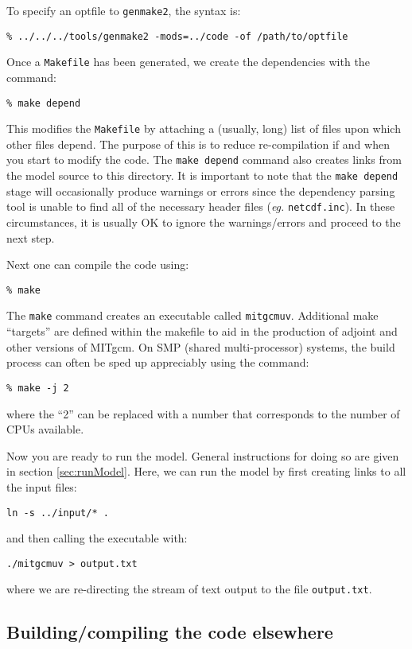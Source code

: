 To specify an optfile to \texttt{genmake2}, the syntax is:
\begin{verbatim}
% ../../../tools/genmake2 -mods=../code -of /path/to/optfile
\end{verbatim}

Once a \texttt{Makefile} has been generated, we create the
dependencies with the command:
\begin{verbatim}
% make depend
\end{verbatim}
This modifies the \texttt{Makefile} by attaching a (usually, long)
list of files upon which other files depend. The purpose of this is to
reduce re-compilation if and when you start to modify the code. The
{\tt make depend} command also creates links from the model source to
this directory.  It is important to note that the {\tt make depend}
stage will occasionally produce warnings or errors since the
dependency parsing tool is unable to find all of the necessary header
files (\textit{eg.}  \texttt{netcdf.inc}).  In these circumstances, it
is usually OK to ignore the warnings/errors and proceed to the next
step.

Next one can compile the code using:
\begin{verbatim}
% make
\end{verbatim}
The {\tt make} command creates an executable called \texttt{mitgcmuv}.
Additional make ``targets'' are defined within the makefile to aid in
the production of adjoint and other versions of MITgcm.  On SMP
(shared multi-processor) systems, the build process can often be sped
up appreciably using the command:
\begin{verbatim}
% make -j 2
\end{verbatim}
where the ``2'' can be replaced with a number that corresponds to the
number of CPUs available.

Now you are ready to run the model. General instructions for doing so are
given in section \ref{sec:runModel}. Here, we can run the model by
first creating links to all the input files:
\begin{verbatim}
ln -s ../input/* .
\end{verbatim}
and then calling the executable with:
\begin{verbatim}
./mitgcmuv > output.txt
\end{verbatim}
where we are re-directing the stream of text output to the file
\texttt{output.txt}.

\subsection{Building/compiling the code elsewhere}

